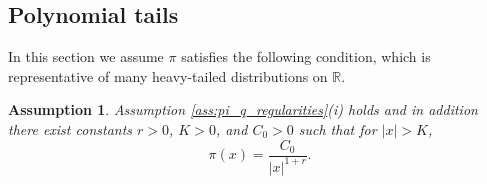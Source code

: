\documentclass{article}
\theoremstyle{definition}
\newtheorem{definition}{Definition}[section]
\theoremstyle{plain}
\newtheorem{assumption}{Assumption}[section]
\begin{document}


\subsection{Polynomial tails}
\label{subsec:heavy_tailed_target}

In this section we assume $\pi$ satisfies the following condition, which is representative of many heavy-tailed distributions on $\mathbb{R}$.
\begin{assumption}
\label{ass:heavy-tailed}
Assumption \ref{ass:pi_q_regularities}(i) holds and in addition there exist constants $r>0$, $K>0$, and $C_0>0$ such that for $|x|>K$,
$$
\pi(x) = \frac{C_0}{|x|^{1+r}}.
$$  
\end{assumption}
\end{document}

